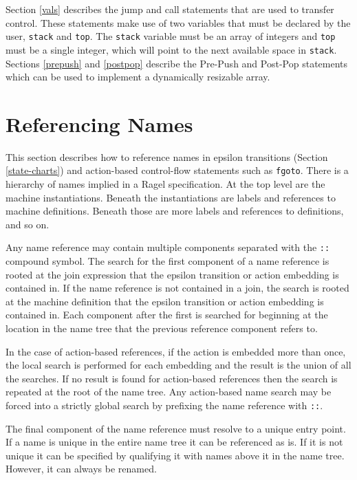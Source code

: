 \documentclass[letterpaper,11pt,oneside]{book}
\begin{document}
Section \ref{vals} describes the jump and call statements that are used to
transfer control. These statements make use of two variables that must be
declared by the user, \verb|stack| and \verb|top|. The \verb|stack| variable
must be an array of integers and \verb|top| must be a single integer, which
will point to the next available space in \verb|stack|. Sections \ref{prepush}
and \ref{postpop} describe the Pre-Push and Post-Pop statements which can be
used to implement a dynamically resizable array.

\section{Referencing Names}
\label{labels}

This section describes how to reference names in epsilon transitions (Section
\ref{state-charts}) and
action-based control-flow statements such as \verb|fgoto|. There is a hierarchy
of names implied in a Ragel specification.  At the top level are the machine
instantiations. Beneath the instantiations are labels and references to machine
definitions. Beneath those are more labels and references to definitions, and
so on.

Any name reference may contain multiple components separated with the \verb|::|
compound symbol.  The search for the first component of a name reference is
rooted at the join expression that the epsilon transition or action embedding
is contained in. If the name reference is not contained in a join,
the search is rooted at the machine definition that the epsilon transition or
action embedding is contained in. Each component after the first is searched
for beginning at the location in the name tree that the previous reference
component refers to.

In the case of action-based references, if the action is embedded more than
once, the local search is performed for each embedding and the result is the
union of all the searches. If no result is found for action-based references then
the search is repeated at the root of the name tree.  Any action-based name
search may be forced into a strictly global search by prefixing the name
reference with \verb|::|.

The final component of the name reference must resolve to a unique entry point.
If a name is unique in the entire name tree it can be referenced as is. If it
is not unique it can be specified by qualifying it with names above it in the
name tree. However, it can always be renamed.
\end{document}
